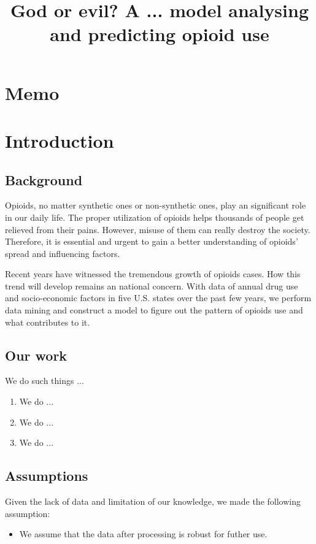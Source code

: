 \documentclass[11pt]{article}
\title{\large God or evil? A ... model analysing and predicting opioid use}  %
\newcommand{\upcite}[1]{\textsuperscript{\textsuperscript{\cite{#1}}}}
\begin{document}

\section*{Memo}
\newpage

\section{Introduction}
\subsection{Background}
Opioids, no matter synthetic ones or non-synthetic ones, play an significant role in our daily life. The proper utilization of opioids helps thousands of people get relieved from their pains. However, misuse of them can really destroy the society. Therefore, it is essential and urgent to gain a better understanding of opioids' spread and influencing factors.

Recent years have witnessed the tremendous growth of opioids cases. How this trend will develop remains an national concern. With data of annual drug use and socio-economic factors in five U.S. states over the past few years, we perform data mining and construct a model to figure out the pattern of opioids use and what contributes to it.


\subsection{Our work}
We do such things ...

\begin{enumerate}[\bfseries 1.]
    \item We do ...
    \item We do ...
    \item We do ...
\end{enumerate}

\subsection{Assumptions}
Given the lack of data and limitation of our knowledge, we made the following assumption:
\begin{itemize}
    \item We assume that the data after processing is robust for futher use.
\end{itemize}
\end{document}
